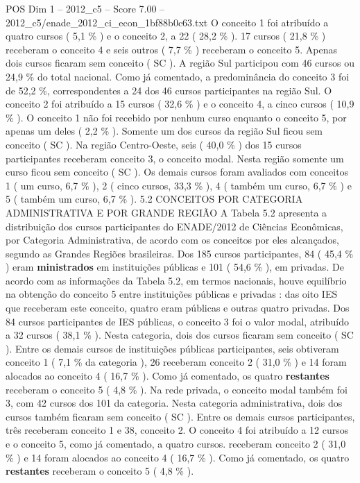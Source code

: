 \begin{textsample}{POS Dim 1 – 2012\_c5 – Score 7.00 – 2012\_c5/enade\_2012\_ci\_econ\_1bf88b0c63.txt}
O conceito 1 foi atribuído a quatro cursos ( 5,1 \% ) e o conceito 2, a 22 ( 28,2 \% ). 17 cursos ( 21,8 \% ) receberam o conceito 4 e seis outros ( 7,7 \% ) receberam o conceito 5.
Apenas dois cursos ficaram sem conceito ( SC ).
A região Sul participou com 46 cursos ou 24,9 \% do total nacional.
Como já comentado, a predominância do conceito 3 foi de 52,2 \%, correspondentes a 24 dos 46 cursos participantes na região Sul.
O conceito 2 foi atribuído a 15 cursos ( 32,6 \% ) e o conceito 4, a cinco cursos ( 10,9 \% ).
O conceito 1 não foi recebido por nenhum curso enquanto o conceito 5, por apenas um deles ( 2,2 \% ).
Somente um dos cursos da região Sul ficou sem conceito ( SC ).
Na região Centro-Oeste, seis ( 40,0 \% ) dos 15 cursos participantes receberam conceito 3, o conceito modal.
Nesta região somente um curso ficou sem conceito ( SC ).
Os demais cursos foram avaliados com conceitos 1 ( um curso, 6,7 \% ), 2 ( cinco cursos, 33,3 \% ), 4 ( também um curso, 6,7 \% ) e 5 ( também um curso, 6,7 \% ). 5.2 CONCEITOS POR CATEGORIA ADMINISTRATIVA E POR GRANDE REGIÃO A Tabela 5.2 apresenta a distribuição dos cursos participantes do ENADE/2012 de Ciências Econômicas, por Categoria Administrativa, de acordo com os conceitos por eles alcançados, segundo as Grandes Regiões brasileiras.
Dos 185 cursos participantes, 84 ( 45,4 \% ) eram \textbf{ministrados} em instituições públicas e 101 ( 54,6 \% ), em privadas.
De acordo com as informações da Tabela 5.2, em termos nacionais, houve equilíbrio na obtenção do conceito 5 entre instituições públicas e privadas : das oito IES que receberam este conceito, quatro eram públicas e outras quatro privadas.
Dos 84 cursos participantes de IES públicas, o conceito 3 foi o valor modal, atribuído a 32 cursos ( 38,1 \% ).
Nesta categoria, dois dos cursos ficaram sem conceito ( SC ).
Entre os demais cursos de instituições públicas participantes, seis obtiveram conceito 1 ( 7,1 \% da categoria ), 26 receberam conceito 2 ( 31,0 \% ) e 14 foram alocados ao conceito 4 ( 16,7 \% ).
Como já comentado, os quatro \textbf{restantes} receberam o conceito 5 ( 4,8 \% ).
Na rede privada, o conceito modal também foi 3, com 42 cursos dos 101 da categoria.
Nesta categoria administrativa, dois dos cursos também ficaram sem conceito ( SC ).
Entre os demais cursos participantes, três receberam conceito 1 e 38, conceito 2.
O conceito 4 foi atribuído a 12 cursos e o conceito 5, como já comentado, a quatro cursos. receberam conceito 2 ( 31,0 \% ) e 14 foram alocados ao conceito 4 ( 16,7 \% ).
Como já comentado, os quatro \textbf{restantes} receberam o conceito 5 ( 4,8 \% ).

\end{textsample}
